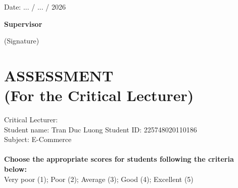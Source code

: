 \hspace{9cm} Date: ... / ... / 2026

\hspace{9.8cm}\textbf{Supervisor}

\vspace{-6pt}
\hspace{9.8cm}(Signature)
\cleardoublepage

\section*{ASSESSMENT\\\fontsize{14pt}{0pt}\selectfont \vspace{4pt}\textnormal{(For the Critical Lecturer)}}
\thispagestyle{empty}
\vspace{-16pt}
\hspace{-1cm}Critical Lecturer:\dotfill\\
Student name: Tran Duc Luong Student ID: 225748020110186\\
Subject: E-Commerce\\
\\
\textbf{Choose the appropriate scores for students following the criteria below:}\\
Very poor (1); Poor (2); Average (3); Good (4); Excellent (5) 

